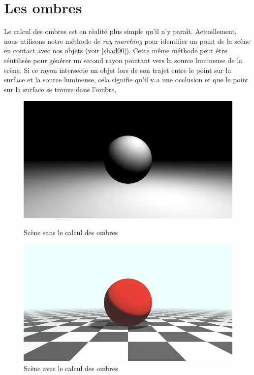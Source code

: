 \newpage
\section{Les ombres}
Le calcul des ombres est en réalité plus simple qu'il n'y paraît. Actuellement, nous utilisons notre méthode de \textit{ray marching} pour identifier un point de la scène en contact avec nos objets (voir \ref{shad00}). Cette même méthode peut être réutilisée pour générer un second rayon pointant vers la source lumineuse de la scène. Si ce rayon intersecte un objet lors de son trajet entre le point sur la surface et la source lumineuse, cela signifie qu'il y a une occlusion et que le point sur la surface se trouve dans l'ombre.

\begin{figure}[h]
  \begin{minipage}[b]{0.45\linewidth}
    \centering
    \includegraphics[width=\linewidth]{images/shaders/shad00.png}
    \caption{Scène sans le calcul des ombres}
    \label{shad00}
  \end{minipage}
  \hspace{0.1\linewidth} %
  \begin{minipage}[b]{0.45\linewidth}
    \centering
    \includegraphics[width=\linewidth]{images/shaders/shad01.png}
    \caption{Scène avec le calcul des ombres}
    \label{shad01}
  \end{minipage}
\end{figure}


